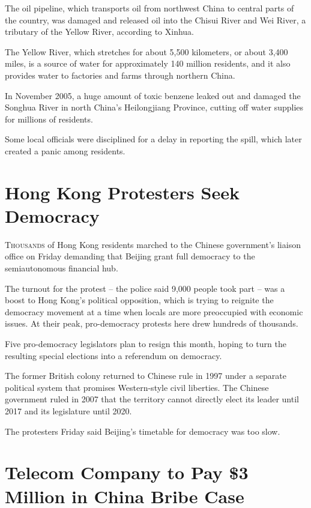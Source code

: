﻿\documentclass[12pt]{article}
\begin{document}
The oil pipeline, which transports oil from northwest China to central parts of the country, was
damaged and released oil into the Chisui River and Wei River, a tributary of the Yellow River,
according to Xinhua.

The Yellow River, which stretches for about 5,500 kilometers, or about 3,400 miles, is a source of
water for approximately 140 million residents, and it also provides water to factories and farms
through northern China.

In November 2005, a huge amount of toxic benzene leaked out and damaged the Songhua River in north
China's Heilongjiang Province, cutting off water supplies for millions of residents.

Some local officials were disciplined for a delay in reporting the spill, which later created a
panic among residents.

\section{Hong Kong Protesters Seek Democracy}

\lettrine{T}{housands} of Hong Kong residents marched to the Chinese
government's liaison office on Friday demanding that Beijing grant full democracy to the
semiautonomous financial hub.

The turnout for the protest -- the police said 9,000 people took part -- was a boost to Hong Kong's
political opposition, which is trying to reignite the democracy movement at a time when locals are
more preoccupied with economic issues. At their peak, pro-democracy protests here drew hundreds of
thousands.

Five pro-democracy legislators plan to resign this month, hoping to turn the resulting special
elections into a referendum on democracy.

The former British colony returned to Chinese rule in 1997 under a separate political system that
promises Western-style civil liberties. The Chinese government ruled in 2007 that the territory
cannot directly elect its leader until 2017 and its legislature until 2020.

The protesters Friday said Beijing's timetable for democracy was too slow.

\section{Telecom Company to Pay \$3 Million in China Bribe Case}
\end{document}
